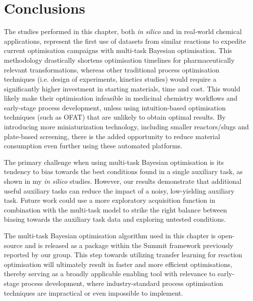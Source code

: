 \section{Conclusions}

The studies performed in this chapter, both \textit{in silico} and in real-world chemical applications, represent the first use of datasets from similar reactions to expedite current optimisation campaigns with multi-task Bayesian optimisation. This methodology drastically shortens optimisation timelines for pharmaceutically relevant transformations, whereas other traditional process optimisation techniques (i.e. design of experiments, kinetics studies) would require a significantly higher investment in starting materials, time and cost. This would likely make their optimisation infeasible in medicinal chemistry workflows and early-stage process development, unless using intuition-based optimisation techniques (such as OFAT) that are unlikely to obtain optimal results. By introducing more miniaturization technology, including smaller reactors/slugs and plate-based screening, there is the added opportunity to reduce material consumption even further using these automated platforms. 

The primary challenge when using multi-task Bayesian optimisation is its tendency to bias towards the best conditions found in a single auxiliary task, as shown in my \textit{in silico} studies. However, our results demonstrate that additional useful auxiliary tasks can reduce the impact of a noisy, low-yielding auxiliary task. Future work could use a more exploratory acquisition function in combination with the multi-task model to strike the right balance between biasing towards the auxiliary task data and exploring untested conditions.

The multi-task Bayesian optimisation algorithm used in this chapter is open-source and is released as a package within the Summit framework previously reported by our group. This step towards utilizing transfer learning for reaction optimisation will ultimately result in faster and more efficient optimisations, thereby serving as a broadly applicable enabling tool with relevance to early-stage process development, where industry-standard process optimisation techniques are impractical or even impossible to implement.


